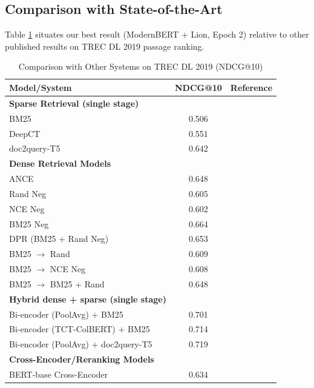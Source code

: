 \documentclass[conference]{IEEEtran}
\begin{document}
\subsection{Comparison with State-of-the-Art}
Table \ref{tab:sota_comparison} situates our best result (ModernBERT + Lion, Epoch 2) relative to other published results on TREC DL 2019 passage ranking.

\begin{table}[htbp]
\centering
\caption{Comparison with Other Systems on TREC DL 2019 (NDCG@10)}
\label{tab:sota_comparison}
\begin{tabular}{l c c}
\toprule
\textbf{Model/System} & \textbf{NDCG@10} & \textbf{Reference} \\
\midrule
\midrule
\textbf{Sparse Retrieval (single stage)} & & \\
\midrule
BM25 & 0.506 & \cite{lin2020distill} \\
DeepCT & 0.551 & \cite{gao2021complementing} \\
doc2query-T5 & 0.642 & \cite{Lin2021PretrainedTF} \\
\midrule
\textbf{Dense Retrieval Models} & & \\
\midrule
ANCE & 0.648 & \cite{xiong2020approximate} \\
Rand Neg & 0.605 & \cite{xiong2020approximate} \\
NCE Neg & 0.602 & \cite{xiong2020approximate} \\
BM25 Neg & 0.664 & \cite{xiong2020approximate} \\
DPR (BM25 + Rand Neg) & 0.653 & \cite{xiong2020approximate} \\
BM25 $\rightarrow$ Rand & 0.609 & \cite{xiong2020approximate} \\
BM25 $\rightarrow$ NCE Neg & 0.608 & \cite{xiong2020approximate} \\
BM25 $\rightarrow$ BM25 + Rand & 0.648 & \cite{xiong2020approximate} \\
\midrule
\textbf{Hybrid dense + sparse (single stage)} & & \\
\midrule
Bi-encoder (PoolAvg) + BM25 & 0.701 & \cite{lin2020distill} \\
Bi-encoder (TCT-ColBERT) + BM25 & 0.714 & \cite{lin2020distill} \\
Bi-encoder (PoolAvg) + doc2query-T5 & 0.719 & \cite{lin2020distill} \\
\midrule
\textbf{Cross-Encoder/Reranking Models} & & \\
\midrule
BERT-base Cross-Encoder & 0.634 & \cite{Lin2021PretrainedTF} \\

\end{tabular}
\end{table}
\end{document}

